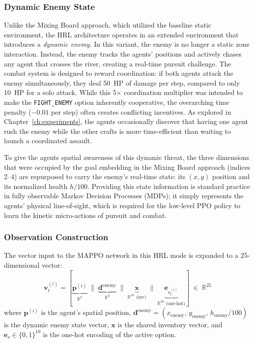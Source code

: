 \subsubsection{Dynamic Enemy State}

Unlike the Mixing Board approach, which utilized the baseline static environment, the HRL architecture operates in an extended environment that introduces a \emph{dynamic enemy}. In this variant, the enemy is no longer a static zone interaction. Instead, the enemy tracks the agents' positions and actively chases any agent that crosses the river, creating a real-time pursuit challenge. The combat system is designed to reward coordination: if both agents attack the enemy simultaneously, they deal 50~HP of damage per step, compared to only 10~HP for a solo attack. While this 5$\times$ coordination multiplier was intended to make the \texttt{FIGHT\_ENEMY} option inherently cooperative, the overarching time penalty ($-0.01$ per step) often creates conflicting incentives. As explored in Chapter~\ref{ch:experiments}, the agents occasionally discover that having one agent rush the enemy while the other crafts is more time-efficient than waiting to launch a coordinated assault.

To give the agents spatial awareness of this dynamic threat, the three dimensions that were occupied by the goal embedding in the Mixing Board approach (indices 2--4) are repurposed to carry the enemy's real-time state: its $(x, y)$ position and its normalized health $h/100$. Providing this state information is standard practice in fully observable Markov Decision Processes (MDPs); it simply represents the agents' physical line-of-sight, which is required for the low-level PPO policy to learn the kinetic micro-actions of pursuit and combat.

\subsubsection{Observation Construction}

The vector input to the MAPPO network in this HRL mode is expanded to a 25-dimensional vector:
\begin{equation}
\label{eq:hrl_obs}
    \mathbf{v}_t^{(i)}
    =
    \left[
        \underbrace{\mathbf{p}^{(i)}}_{\mathbb{R}^2}
        \;\Big\|\;
        \underbrace{\mathbf{d}^{\text{enemy}}}_{\mathbb{R}^3}
        \;\Big\|\;
        \underbrace{\mathbf{x}}_{\mathbb{R}^{10}\text{ (inv)}}
        \;\Big\|\;
        \underbrace{\mathbf{e}_{o_t^{(i)}}}_{\mathbb{R}^{10}\text{ (one-hot)}}
    \right]
    \;\in\; \mathbb{R}^{25}
\end{equation}
where $\mathbf{p}^{(i)}$ is the agent's spatial position, $\mathbf{d}^{\text{enemy}} = (x_{\text{enemy}},\, y_{\text{enemy}},\, h_{\text{enemy}}/100)$ is the dynamic enemy state vector, $\mathbf{x}$ is the shared inventory vector, and $\mathbf{e}_{o}\in\{0,1\}^{10}$ is the one-hot encoding of the active option.

